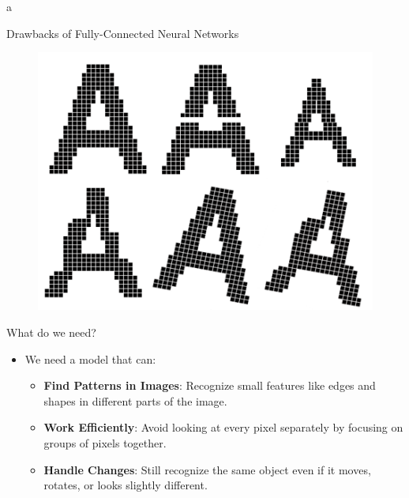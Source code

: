 a\documentclass[10pt]{beamer}
\theoremstyle{remark}
\theoremstyle{definition}
\begin{document}
\begin{frame}[allowframebreaks]{Drawbacks of Fully-Connected Neural Networks}
\begin{figure}
\centering
\includegraphics[width=1.0\textwidth,height=0.6\textheight,keepaspectratio]{./images/nn_5.png}
\end{figure}


\end{frame}

\framebreak

\begin{frame}{What do we need?}
\begin{itemize}
    \item We need a model that can:
    \begin{itemize}
        \item \textbf{Find Patterns in Images}: Recognize small features like edges and shapes in different parts of the image.
        \item \textbf{Work Efficiently}: Avoid looking at every pixel separately by focusing on groups of pixels together.
        \item \textbf{Handle Changes}: Still recognize the same object even if it moves, rotates, or looks slightly different.
    \end{itemize}
\end{itemize}


\end{frame}

\framebreak
\end{document}
